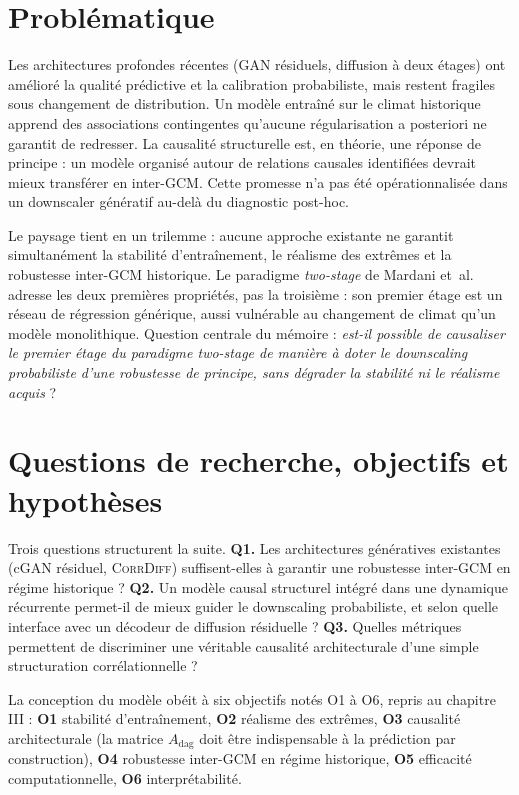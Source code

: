 \documentclass[14pt,a4paper,openany]{extreport}
\newcommand{\CorrDiff}{\textsc{CorrDiff}}
\newcommand{\Adag}{\ensuremath{A_{\mathrm{dag}}}}
\begin{document}
\section*{Problématique}

Les architectures profondes récentes (GAN résiduels, diffusion à deux étages) ont amélioré la qualité prédictive et la calibration probabiliste, mais restent fragiles sous changement de distribution. Un modèle entraîné sur le climat historique apprend des associations contingentes qu'aucune régularisation a posteriori ne garantit de redresser. La causalité structurelle est, en théorie, une réponse de principe : un modèle organisé autour de relations causales identifiées devrait mieux transférer en inter-GCM. Cette promesse n'a pas été opérationnalisée dans un downscaler génératif au-delà du diagnostic post-hoc.

Le paysage tient en un trilemme : aucune approche existante ne garantit simultanément la stabilité d'entraînement, le réalisme des extrêmes et la robustesse inter-GCM historique. Le paradigme \emph{two-stage} de Mardani et~al.~\cite{mardani_corrdiff_2023} adresse les deux premières propriétés, pas la troisième : son premier étage est un réseau de régression générique, aussi vulnérable au changement de climat qu'un modèle monolithique. Question centrale du mémoire : \emph{est-il possible de causaliser le premier étage du paradigme two-stage de manière à doter le downscaling probabiliste d'une robustesse de principe, sans dégrader la stabilité ni le réalisme acquis} ?

\section*{Questions de recherche, objectifs et hypothèses}

Trois questions structurent la suite. \textbf{Q1.} Les architectures génératives existantes (cGAN résiduel, \CorrDiff{}) suffisent-elles à garantir une robustesse inter-GCM en régime historique ? \textbf{Q2.} Un modèle causal structurel intégré dans une dynamique récurrente permet-il de mieux guider le downscaling probabiliste, et selon quelle interface avec un décodeur de diffusion résiduelle ? \textbf{Q3.} Quelles métriques permettent de discriminer une véritable causalité architecturale d'une simple structuration corrélationnelle ?

La conception du modèle obéit à six objectifs notés O1 à O6, repris au chapitre III : \textbf{O1} stabilité d'entraînement, \textbf{O2} réalisme des extrêmes, \textbf{O3} causalité architecturale (la matrice $\Adag$ doit être indispensable à la prédiction par construction), \textbf{O4} robustesse inter-GCM en régime historique, \textbf{O5} efficacité computationnelle, \textbf{O6} interprétabilité.
\end{document}

